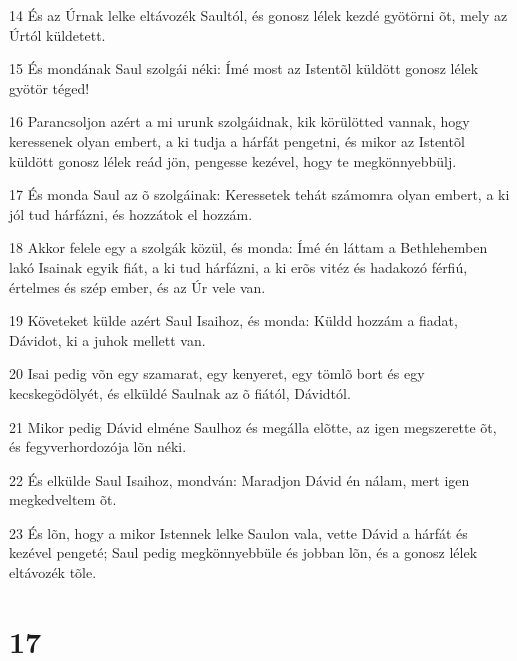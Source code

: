 \par 14 És az Úrnak lelke eltávozék Saultól, és gonosz lélek kezdé gyötörni õt, mely az Úrtól küldetett.
\par 15 És mondának Saul szolgái néki: Ímé most az Istentõl küldött gonosz lélek gyötör téged!
\par 16 Parancsoljon azért a mi urunk szolgáidnak, kik körülötted vannak, hogy keressenek olyan embert, a ki tudja a hárfát pengetni, és mikor az Istentõl küldött gonosz lélek reád jön, pengesse kezével, hogy te megkönnyebbülj.
\par 17 És monda Saul az õ szolgáinak: Keressetek tehát számomra olyan embert, a ki jól tud hárfázni, és hozzátok el hozzám.
\par 18 Akkor felele egy a szolgák közül, és monda: Ímé én láttam a Bethlehemben lakó Isainak egyik fiát, a ki tud hárfázni, a ki erõs vitéz és hadakozó férfiú, értelmes és szép ember, és az Úr vele van.
\par 19 Követeket külde azért Saul Isaihoz, és monda: Küldd hozzám a fiadat, Dávidot, ki a juhok mellett van.
\par 20 Isai pedig võn egy szamarat, egy kenyeret, egy tömlõ bort és egy kecskegödölyét, és elküldé Saulnak az õ fiától, Dávidtól.
\par 21 Mikor pedig Dávid elméne Saulhoz és megálla elõtte, az igen megszerette õt, és fegyverhordozója lõn néki.
\par 22 És elkülde Saul Isaihoz, mondván: Maradjon Dávid én nálam, mert igen megkedveltem õt.
\par 23 És lõn, hogy a mikor Istennek lelke Saulon vala, vette Dávid a hárfát és kezével pengeté; Saul pedig megkönnyebbüle és jobban lõn, és a gonosz lélek eltávozék tõle.

\chapter{17}

